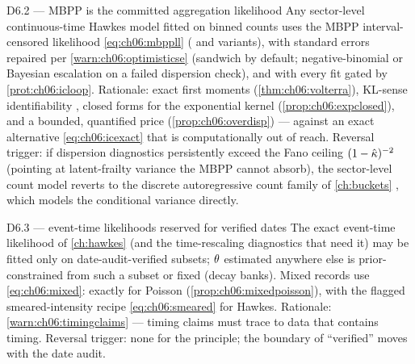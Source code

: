 \begin{decision}{D6.2 --- MBPP is the committed aggregation likelihood}
Any sector-level continuous-time Hawkes model fitted on binned counts uses
the MBPP interval-censored likelihood \cref{eq:ch06:mbppll}
( and variants), with standard errors repaired per
\cref{warn:ch06:optimisticse} (sandwich by default; negative-binomial or
Bayesian escalation on a failed dispersion check), and with every fit
gated by \cref{prot:ch06:icloop}. Rationale: exact first moments
(\cref{thm:ch06:volterra}), KL-sense identifiability
\citep{rizoiu2022}, closed forms for the exponential kernel
(\cref{prop:ch06:expclosed}), and a bounded, quantified price
(\cref{prop:ch06:overdisp}) --- against an exact alternative
\cref{eq:ch06:icexact} that is computationally out of reach. Reversal
trigger: if dispersion diagnostics persistently exceed the Fano ceiling
$(1-\hat{\kappa})^{-2}$ (pointing at latent-frailty variance the MBPP
cannot absorb), the sector-level count model reverts to the discrete
autoregressive count family of \cref{ch:buckets}
\citep{fokianos2009}, which models the conditional variance directly.
\end{decision}

\begin{decision}{D6.3 --- event-time likelihoods reserved for verified dates}
The exact event-time likelihood of \cref{ch:hawkes} (and the time-rescaling
diagnostics that need it) may be fitted only on date-audit-verified
subsets; $\theta$ estimated anywhere else is prior-constrained from such a
subset or fixed (decay banks). Mixed records use
\cref{eq:ch06:mixed}: exactly for Poisson
(\cref{prop:ch06:mixedpoisson}), with the flagged smeared-intensity recipe
\cref{eq:ch06:smeared} for Hawkes. Rationale:
\cref{warn:ch06:timingclaims} --- timing claims must trace to data that
contains timing. Reversal trigger: none for the principle; the boundary of
``verified'' moves with the date audit.
\end{decision}

